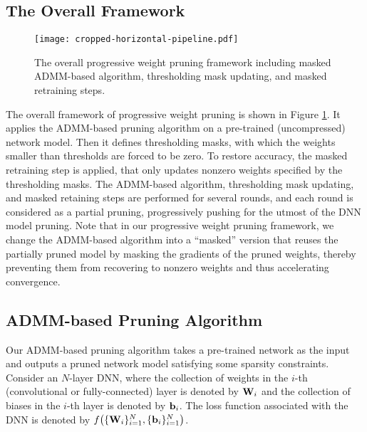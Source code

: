 \documentclass{article} %
\begin{document}
\subsection{The Overall Framework}\label{sec:overall}

\begin{figure}[h]
\begin{center}
\texttt{[image: cropped-horizontal-pipeline.pdf]}
\end{center}
\caption{The overall progressive weight pruning framework including masked ADMM-based algorithm, thresholding mask updating, and masked retraining steps.}\label{fig:framework}
\end{figure}

The overall framework of progressive weight pruning is shown in Figure \ref{fig:framework}. 
It applies the ADMM-based pruning algorithm on a pre-trained (uncompressed) network model.
Then it defines thresholding masks, with which the weights smaller than thresholds are forced to be zero.
To restore accuracy, the masked retraining step is applied, that only updates nonzero weights specified by the thresholding masks.
The ADMM-based algorithm, thresholding mask updating, and masked retaining steps are performed for several rounds, and each round is considered as a partial pruning, progressively pushing for the utmost of the DNN model pruning. 
Note that in our progressive weight pruning framework, we change the ADMM-based algorithm into a ``masked'' version that reuses the partially pruned model by masking the gradients of the pruned weights, thereby preventing them from recovering to nonzero weights and thus accelerating convergence.











\subsection{ADMM-based Pruning Algorithm}\label{sec:regularization}

Our ADMM-based pruning algorithm takes a pre-trained network as the input and outputs a pruned network model satisfying some sparsity constraints.
Consider an $N$-layer DNN, where the collection of weights in the $i$-th (convolutional or fully-connected) layer is denoted by ${\bf{W}}_{i}$ and the collection of biases in the $i$-th layer is denoted by ${\bf{b}}_{i}$. The loss function associated with the DNN is denoted by $f \big( \{{\bf{W}}_{i}\}_{i=1}^N, \{{\bf{b}}_{i} \}_{i=1}^N \big)$. 
\end{document}
